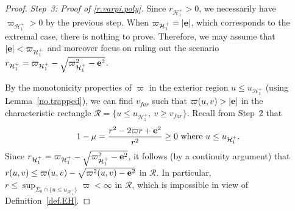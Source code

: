\documentclass[10pt, reqno]{amsart}
\theoremstyle{definition}
\theoremstyle{remark}
\numberwithin{equation}{section}
\newcommand{\abs}[1]{\vert#1\vert}
\newcommand{\set}[1]{\{#1\}}
\newcommand{\0}{\emptyset}
\newcommand{\Sgm}{\Sigma}
\newcommand{\bfe}{{\bf e}}
\newcommand{\calH}{\mathcal H}
\newcommand{\calR}{\mathcal R}
\newcommand{\EH}{\calH^{+}}
\newcommand{\pfstep}[1]{\vspace{.5em} {\it \noindent #1.}}
\newcommand{\e}{\bfe}							%
\begin{document}
\begin{proof}
\pfstep{Step~3: Proof of \eqref{r.varpi.poly}}
Since $r_{\EH_{1}} > 0$, we necessarily have $\varpi_{\EH_{1}} > 0$ by the previous step. When $\varpi_{\EH_{1}} = \abs{\e}$, which corresponds to the extremal case, there is nothing to prove. Therefore, we may assume that $\abs{\e} < \varpi_{\EH_{1}}$ and moreover focus on ruling out the scenario $r_{\EH_{1}} = \varpi_{\EH_{1}} - \sqrt{\varpi_{\EH_{1}}^{2} - \e^{2}}$.

By the monotonicity properties of $\varpi$ in the exterior region $u \leq u_{\EH_{1}}$ (using Lemma~\ref{no.trapped}), we can find $v_{far}$ such that $\varpi(u, v) > \abs{\e}$ in the characteristic rectangle $\calR = \set{u \leq u_{\EH_{1}}, \ v \geq v_{far}}$. Recall from Step~2 that 
\begin{equation*}
1-\mu = \frac{r^{2} - 2 \varpi r + \e^{2}}{r^{2}} \geq 0 \hbox{ where } u \leq u_{\EH_{1}}.
\end{equation*}
Since $r_{\EH_{1}} = \varpi_{\EH_{1}} - \sqrt{\varpi_{\EH_{1}}^{2} - \e^{2}}$, it follows (by a continuity argument) that $r(u, v) \leq \varpi(u, v) - \sqrt{\varpi^{2}(u, v) - \e^{2}}$ in $\calR$. In particular, $r \leq \sup_{\Sgm_{0} \cap \set{u \leq u_{\EH_{1}}}} \varpi < \infty$ in $\calR$, which is impossible in view of Definition~\ref{def.EH}. \qedhere


\end{proof}
\end{document}

